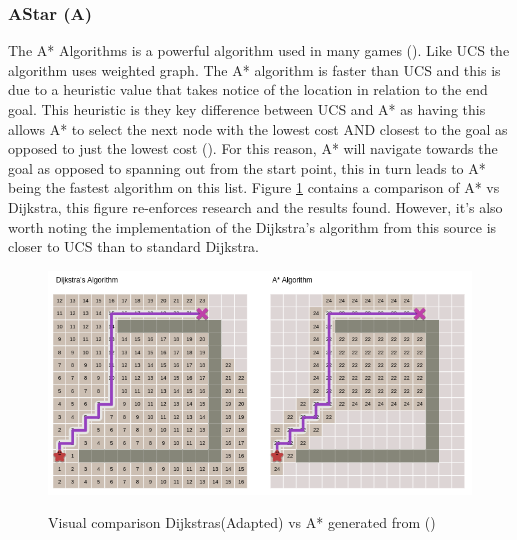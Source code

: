 \subsubsection{AStar (A\*)}\label{sec:astar}
The A* Algorithms is a powerful algorithm used in many games (\cite{cai_2015_a}). Like UCS the algorithm uses weighted graph. The A* algorithm is faster than UCS and this is due to a heuristic value that takes notice of the location in relation to the end goal. This heuristic is they key difference between UCS and A* as having this allows A* to select the next node with the lowest cost AND closest to the goal as opposed to just the lowest cost (\cite{cai_2015_a}). For this reason, A* will navigate towards the goal as opposed to spanning out from the start point, this in turn leads to A* being the fastest algorithm on this list. Figure \ref{fig:dijkvsastar} contains a comparison of A* vs Dijkstra, this figure re-enforces research and the results found. However, it's also worth noting the implementation of the Dijkstra's algorithm from this source is closer to UCS than to standard Dijkstra. 
\begin{figure}[h]
	\includegraphics[width=\linewidth]{images/research/Dijkstrasvastar.png}\\
	\caption{Visual comparison Dijkstras(Adapted) vs A* generated from (\cite{redblobgames_2014_red})}
	\label{fig:dijkvsastar}
\end{figure}

